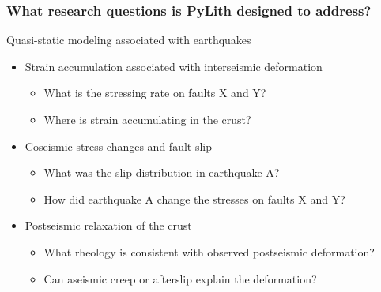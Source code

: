 \documentclass[aspectratio=169]{beamer}
\begin{document}
\begin{frame}
  \frametitle{What research questions is PyLith designed to address?}

  \vfill
  Quasi-static modeling associated with earthquakes
  \vfill

  \begin{itemize}
  \item Strain accumulation associated with interseismic deformation
    \begin{itemize}
    \item What is the stressing rate on faults X and Y?
    \item Where is strain accumulating in the crust?
    \end{itemize}
  \item Coseismic stress changes and fault slip
    \begin{itemize}
    \item What was the slip distribution in earthquake A?
    \item How did earthquake A change the stresses on faults X and Y?
    \end{itemize}
  \item Postseismic relaxation of the crust
    \begin{itemize}
    \item What rheology is consistent with observed postseismic deformation?
    \item Can aseismic creep or afterslip explain the deformation?
    \end{itemize}
  \end{itemize}
  \vfill

\end{frame}
\end{document}
